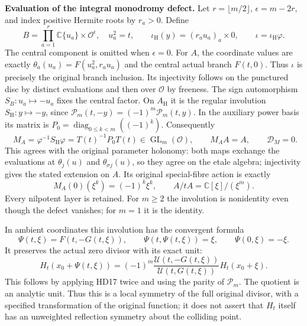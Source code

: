 \HD\textbf{Evaluation of the integral monodromy defect.}
Let $r=\lfloor m/2\rfloor$, $\epsilon=m-2r$, and index positive
Hermite roots by $r_a>0$. Define
\[
 B=\prod_{a=1}^r\mathbb C\{u_a\}\times\mathcal O^\epsilon,\quad
 u_a^2=t,\qquad
 \iota_{\mathrm H}(y)=(r_au_a)_a\times0,\qquad
 \iota=\iota_{\mathrm H}\varphi .
 \tag{HD18}\label{hd:B}
\]
The central component is omitted when $\epsilon=0$.
For $A$, the coordinate values are exactly
$\theta_a(u_a)=F(u_a^2,r_au_a)$ and the central actual branch
$F(t,0)$. Thus $\iota$ is precisely the original branch inclusion.
Its injectivity follows on the punctured disc by distinct evaluations
and then over $\mathcal O$ by freeness.
The sign automorphism $S_B:u_a\mapsto-u_a$ fixes the central factor.
On $A_{\mathrm H}$ it is the regular involution
$S_{\mathrm H}:y\mapsto-y$, since
$\mathcal P_m(t,-y)=(-1)^m\mathcal P_m(t,y)$.
In the auxiliary power basis its matrix is
$P_0=\operatorname{diag}_{0\le k<m}((-1)^k)$.
Consequently
\[
 \boxed{\quad M_A=\varphi^{-1}S_{\mathrm H}\varphi
             =T(t)^{-1}P_0T(t)\in\operatorname{GL}_m(\mathcal O),
 \qquad M_AA=A,\qquad\mathcal D_M=0.\quad}
 \tag{HD19}\label{hd:vanishing}
\]
This agrees with the original parameter holonomy:
both maps exchange the evaluations at $\theta_j(u)$ and
$\theta_{\sigma j}(u)$, so they agree on the etale algebra;
injectivity gives the stated extension on $A$.
Its original special-fibre action is exactly
\[
 M_A(0)(\xi^k)=(-1)^k\xi^k,\qquad
 A/tA=\mathbb C[\xi]/(\xi^m).
 \tag{HD20}\label{hd:central}
\]
Every nilpotent layer is retained. For $m\ge2$ the involution is
nonidentity even though the defect vanishes; for $m=1$ it is
the identity.

In ambient coordinates this involution has the convergent formula
\[
 \Psi(t,\xi)=F(t,-G(t,\xi)),\qquad
 \Psi(t,\Psi(t,\xi))=\xi,\qquad \Psi(0,\xi)=-\xi .
 \tag{HD21}\label{hd:ambient}
\]
It preserves the actual zero divisor with its exact unit:
\[
 H_t(x_0+\Psi(t,\xi))
   =(-1)^m
     \frac{\mathcal U(t,-G(t,\xi))}{\mathcal U(t,G(t,\xi))}
       H_t(x_0+\xi).
 \tag{HD22}\label{hd:fullunit}
\]
This follows by applying HD17 twice and using the parity of
$\mathcal P_m$. The quotient is an analytic unit.
Thus this is a local symmetry of the full original divisor,
with a specified transformation of the original function;
it does not assert that $H_t$ itself has an unweighted reflection
symmetry about the colliding point.

